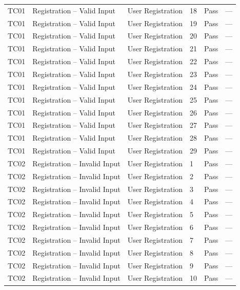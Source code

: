 {\begin{longtable}{@{}p{1.2cm} p{4.2cm} p{4.4cm} p{0.8cm} p{0.9cm} p{1.6cm}@{}}
  TC01 & Registration -- Valid Input & User Registration & 18 & Pass & --- \\
  TC01 & Registration -- Valid Input & User Registration & 19 & Pass & --- \\
  TC01 & Registration -- Valid Input & User Registration & 20 & Pass & --- \\
  TC01 & Registration -- Valid Input & User Registration & 21 & Pass & --- \\
  TC01 & Registration -- Valid Input & User Registration & 22 & Pass & --- \\
  TC01 & Registration -- Valid Input & User Registration & 23 & Pass & --- \\
  TC01 & Registration -- Valid Input & User Registration & 24 & Pass & --- \\
  TC01 & Registration -- Valid Input & User Registration & 25 & Pass & --- \\
  TC01 & Registration -- Valid Input & User Registration & 26 & Pass & --- \\
  TC01 & Registration -- Valid Input & User Registration & 27 & Pass & --- \\
  TC01 & Registration -- Valid Input & User Registration & 28 & Pass & --- \\
  TC01 & Registration -- Valid Input & User Registration & 29 & Pass & --- \\
  \midrule
  TC02 & Registration -- Invalid Input & User Registration & 1 & Pass & --- \\
  TC02 & Registration -- Invalid Input & User Registration & 2 & Pass & --- \\
  TC02 & Registration -- Invalid Input & User Registration & 3 & Pass & --- \\
  TC02 & Registration -- Invalid Input & User Registration & 4 & Pass & --- \\
  TC02 & Registration -- Invalid Input & User Registration & 5 & Pass & --- \\
  TC02 & Registration -- Invalid Input & User Registration & 6 & Pass & --- \\
  TC02 & Registration -- Invalid Input & User Registration & 7 & Pass & --- \\
  TC02 & Registration -- Invalid Input & User Registration & 8 & Pass & --- \\
  TC02 & Registration -- Invalid Input & User Registration & 9 & Pass & --- \\
  TC02 & Registration -- Invalid Input & User Registration & 10 & Pass & --- \\

\end{longtable}}
